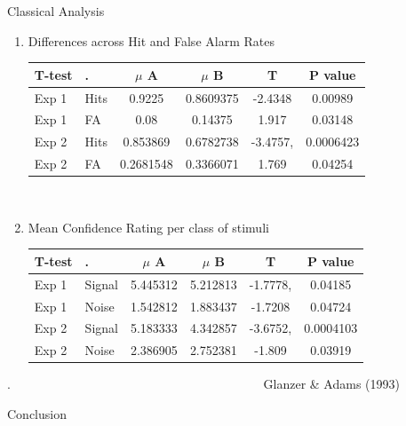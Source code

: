 \documentclass[final]{beamer}
\newlength{\onecolwid}
\begin{document}
\begin{frame}[t]
\begin{columns}[t]
\begin{column}{\onecolwid}
\begin{alertblock}{Classical Analysis}
\begin{enumerate}
$\qquad$


\item Differences across Hit and False Alarm Rates
\begin{table}
\vspace{3ex}
\begin{tabular}{l l | c c c c}
\toprule
\textbf{T-test} & \textbf{.} & \textbf{$\mu$ A} & \textbf{$\mu$ B} & \textbf{T} & \textbf{P value}\\
\midrule
Exp 1 & Hits & 0.9225 & 0.8609375 & -2.4348 & 0.00989 \\
Exp 1 & FA & 0.08 & 0.14375 & 1.917 & 0.03148 \\
Exp 2 & Hits & 0.853869 & 0.6782738 & -3.4757, & 0.0006423 \\
Exp 2 & FA & 0.2681548 & 0.3366071 & 1.769 & 0.04254 \\
\bottomrule
\end{tabular}
\end{table}

$\quad$

\item Mean Confidence Rating per class of stimuli
\begin{table}
\vspace{3ex}
\begin{tabular}{l l |  c c c c}
\toprule
\textbf{T-test} & \textbf{.} & \textbf{$\mu$ A} & \textbf{$\mu$ B} & \textbf{T} & \textbf{P value}\\
\midrule
Exp 1 & Signal & 5.445312 & 5.212813 & -1.7778, & 0.04185 \\
Exp 1 & Noise & 1.542812 & 1.883437 & -1.7208 & 0.04724 \\
Exp 2 & Signal & 5.183333 & 4.342857  & -3.6752, & 0.0004103 \\
Exp 2 & Noise & 2.386905 & 2.752381 & -1.809 & 0.03919 \\
\bottomrule
\end{tabular}
\end{table}
\end{enumerate}
.$\qquad$$\qquad$$\qquad$$\qquad$$\qquad$$\qquad$$\qquad$$\qquad$$\qquad$$\qquad$ Glanzer \& Adams (1993)
\end{alertblock}




\begin{alertblock}{Conclusion}


\end{alertblock}
\end{column}
\end{columns}
\end{frame}
\end{document}
